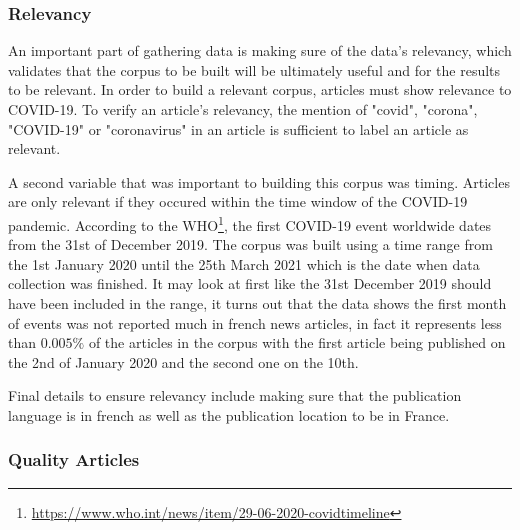 \subsubsection{Relevancy}

An important part of gathering data is making sure of the data's relevancy, which validates that the corpus to be built will be ultimately useful and for the results to be relevant. In order to build a relevant corpus, articles must show relevance to COVID-19. To verify an article's relevancy, the mention of "covid", "corona", "COVID-19" or "coronavirus" in an article is sufficient to label an article as relevant.

A second variable that was important to building this corpus was timing. Articles are only relevant if they occured within the time window of the COVID-19 pandemic. According to the WHO\footnote{\url{https://www.who.int/news/item/29-06-2020-covidtimeline}}, the first COVID-19 event worldwide dates from the 31st of December 2019. The corpus was built using a time range from the 1st January 2020 until the 25th March 2021 which is the date when data collection was finished. It may look at first like the 31st December 2019 should have been included in the range, it turns out that the data shows the first month of events was not reported much in french news articles, in fact it represents less than $0.005\%$ of the articles in the corpus with the first article being published on the 2nd of January 2020 and the second one on the 10th.

Final details to ensure relevancy include making sure that the publication language is in french as well as the publication location to be in France.

\subsubsection{Quality Articles}

